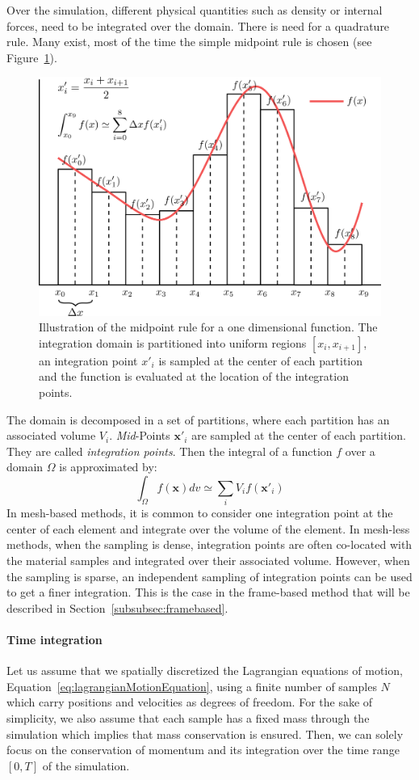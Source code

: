 Over the simulation, different physical quantities such as density or internal forces, need to be integrated over the domain. 
There is need for a quadrature rule. 
Many exist, most of the time the simple midpoint rule is chosen (see Figure~\ref{fig:spatialIntegration}). 
\begin{figure}[H]
	\centering
	\includegraphics[width=0.7\linewidth]{images/continuum_mechanics/spatialIntegration.png}
	\caption[STAR mechanics: Spatial integration]{\label{fig:spatialIntegration} Illustration of the midpoint rule for a one dimensional function. The integration domain is partitioned into uniform regions $\left[x_{i}, x_{i+1}\right]$, an integration point $x'_{i}$ is sampled at the center of each partition and the function is evaluated at the location of the integration points.}
\end{figure}
The domain is decomposed in a set of partitions, where each partition has an associated volume $V_{i}$. 
\emph{Mid}-Points $\mathbf{x'}_{i}$ are sampled at the center of each partition.
They are called \emph{integration points}. 
Then the integral of a function $f$ over a domain $\Omega$ is approximated by:
\begin{equation}
\label{eq:midpointRule}
\int_{\Omega} f(\mathbf{x})dv \simeq \sum_{i} V_{i}f(\mathbf{x'}_{i})
\end{equation}
In mesh-based methods, it is common to consider one integration point at the center of each element and integrate over the volume of the element.
In mesh-less methods, when the sampling is dense, integration points are often co-located with the material samples and integrated over their associated volume. 
However, when the sampling is sparse, an independent sampling of integration points can be used to get a finer integration.
This is the case in the frame-based method that will be described in Section~\ref{subsubsec:framebased}.

\paragraph{Time integration}
Let us assume that we spatially discretized the Lagrangian equations of motion, Equation~\eqref{eq:lagrangianMotionEquation}, using a finite number of samples $N$ which carry positions and velocities as degrees of freedom.
For the sake of simplicity, we also assume that each sample has a fixed mass through the simulation which implies that mass conservation is ensured. Then, we can solely focus on the conservation of momentum and its integration over the time range  $\left[0, T\right]$ of the simulation. 

